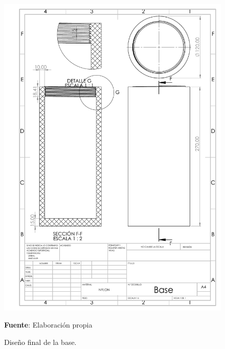 \begin{itemize}
    \begin{figure}[H]
    \centering
    \includegraphics[width=\linewidth]{Imagenes/2019/Base2019.PDF} 
    \caption{Dise\~no final de la base.}{ \textbf{Fuente}: Elaboraci\'on propia}
    \label{fig:Base2020}
    \end{figure}
    

\end{itemize}
